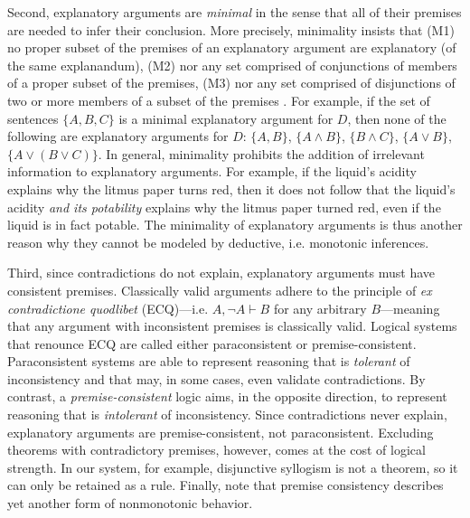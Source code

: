 \documentclass{article}
\theoremstyle{definition}
\theoremstyle{definition}
\theoremstyle{definition}
\theoremstyle{definition}
\theoremstyle{remark}
\theoremstyle{definition}
\theoremstyle{definition}
\newcommand{\jm}[1]{\textcolor{blue}{$^{\textrm{JM}}${#1}}}
\begin{document}
Second, explanatory arguments are \textit{minimal} in the sense that all of their premises are needed to infer their conclusion. More precisely, minimality insists that (M1) no proper subset of the premises of an explanatory argument are explanatory (of the same explanandum), (M2) nor any set comprised of conjunctions of members of a proper subset of the premises, (M3) nor any set comprised of disjunctions of two or more members of a subset of the premises . For example, if the set of sentences $ \{A, B, C\} $ is a minimal explanatory argument for $ D $, then none of the following are explanatory arguments for $ D $:  $ \{A, B\} $, $ \{A\wedge B\} $, $ \{B\wedge C\} $, $ \{A \vee B \}$, $ \{A\vee (B \vee C) \} $. In general, minimality prohibits the addition of irrelevant information to explanatory arguments. For example, if the liquid's acidity explains why the litmus paper turns red, then it does not follow that the liquid's acidity \textit{and its potability} explains why the litmus paper turned red, even if the liquid is in fact potable. The minimality of explanatory arguments is thus another reason why they cannot be modeled by deductive, i.e. monotonic inferences. 

Third, since contradictions do not explain, explanatory arguments must have consistent premises. Classically valid arguments adhere to the principle of \textit{ex contradictione quodlibet} (\textsf{ECQ})---i.e. $ A, \neg A \vdash B $ for any arbitrary $ B $---meaning that any argument with inconsistent premises is classically valid. Logical systems that renounce \textsf{ECQ} are called either paraconsistent or premise-consistent.  Paraconsistent systems are able to represent reasoning that is \textit{tolerant} of inconsistency and that may, in some cases, even validate contradictions. By contrast, a \textit{premise-consistent} logic aims, in the opposite direction, to represent reasoning that is \textit{intolerant} of inconsistency. Since contradictions never explain, explanatory arguments are premise-consistent, not paraconsistent. Excluding theorems with contradictory premises, however, comes at the cost of logical strength. In our system, for example, disjunctive syllogism is not a theorem, so it can only be retained as a rule. Finally, note that premise consistency describes yet another form of nonmonotonic behavior.

\end{document}
